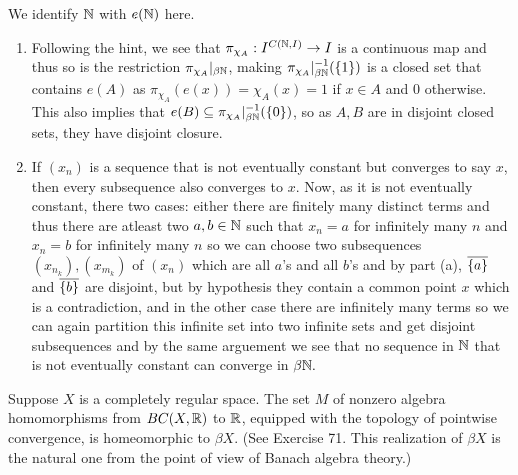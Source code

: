 \documentclass[12pt,a4paper]{article}
\begin{document}
\begin{solution}
 We identify $\mathbb{N}$ with $e(\mathbb{N})$ here. 
\begin{enumerate}[label=\alph*.]
    \item Following the hint, we see that $\pi_{\chi_A}:I^{C(\mathbb{N},I)}\to I$ is a continuous map and thus so is the restriction $\pi_{\chi_A}|_{\beta\mathbb{N}}$, making $\pi_{\chi_A}|_{\beta\mathbb{N}}^{-1}( \qty{1})$ is a closed set that contains $e(A)$ as $\pi_{\chi_A}(e(x))=\chi_A(x)=1$ if $x\in A$ and $0$ otherwise. 
        This also implies that $e(B) \subseteq \pi_{\chi_A}|_{\beta\mathbb{N}}^{-1}( \qty{0})$, so as $A,B$ are in disjoint closed sets, they have disjoint closure. 
    \item If $(x_n)$ is a sequence that is not eventually constant but converges to say $x$, then every subsequence also converges to $x$. 
    Now, as it is not eventually constant, there two cases: either there are finitely many distinct terms and thus there are atleast two $a,b\in\mathbb{N}$ such that $x_n=a$ for infinitely many $n$ and $x_n=b$ for infinitely many $n$ so we can choose two subsequences $(x_{n_k}),(x_{m_k})$ of $(x_n)$ which are all $a$'s and all $b$'s and by part (a), $ \overline{ \qty{a}}$ and $ \overline{ \qty{b}}$ are disjoint, but by hypothesis they contain a common point $x$ which is a contradiction, and in the other case there are infinitely many terms so we can again partition this infinite set into two infinite sets and get disjoint subsequences and by the same arguement we see that no sequence in $\mathbb{N}$ that is not eventually constant can converge in $\beta\mathbb{N}.$ 
\end{enumerate}
\end{solution}
\begin{problem}\label{prob:4-75}
Suppose $X$ is a completely regular space. The set $M$ of nonzero algebra homomorphisms from $BC(X,\mathbb{R})$ to $\mathbb{R}$, equipped with the topology of pointwise convergence, is homeomorphic to $\beta X$. (See Exercise 71. This realization of $\beta X$ is the natural one from the point of view of Banach algebra theory.)
\end{problem}
\end{document}
